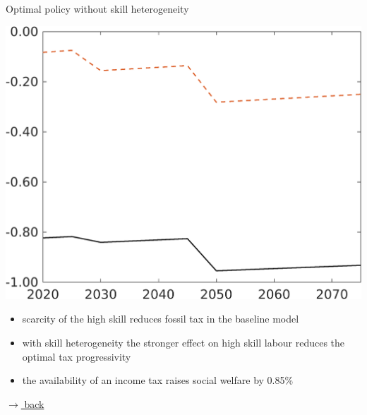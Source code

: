 \documentclass[11pt,aspectratio=169]{beamer}
\begin{document}
\begin{frame}{Optimal policy without skill heterogeneity}
\begin{minipage}[]{0.3\textwidth}
	\end{minipage}
	\begin{minipage}[]{0.3\textwidth}
		\includegraphics[width=1\textwidth]{../codding_model/own_basedOnFried/optimalPol_elastS_DisuSci/figures/all_1705/Single_OPT_T_NoTaus_SWF_spillover0_skillComp_sep1_BN0_ineq0_red0_etaa0.79_lgd0.png}
	\end{minipage}
	
	\vspace{4mm}
	\begin{itemize}
		\item scarcity of the high skill reduces fossil tax in the baseline model
		\vspace{2mm}
		\item with skill heterogeneity the stronger effect on high skill labour reduces the optimal tax progressivity
				\vspace{2mm}
		\item the availability of an income tax raises social welfare by 0.85\%
	\end{itemize}
	\vspace{-2mm}
	\hfill
	\hyperlink{effalloback}{\tiny{$\rightarrow$ back}}
\end{frame}
\end{document}
